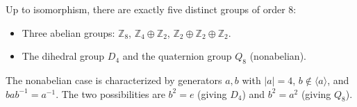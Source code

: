 Up to isomorphism, there are exactly five distinct groups of order $8$:
\begin{itemize}
\item Three abelian groups: $\mathbb{Z}_8$, $\mathbb{Z}_4 \oplus \mathbb{Z}_2$, $\mathbb{Z}_2 \oplus \mathbb{Z}_2 \oplus \mathbb{Z}_2$.
\item The dihedral group $D_4$ and the quaternion group $Q_8$ (nonabelian).
\end{itemize}
The nonabelian case is characterized by generators $a,b$ with $|a| = 4$, $b \notin \langle a \rangle$, and $bab^{-1} = a^{-1}$. The two possibilities are $b^2 = e$ (giving $D_4$) and $b^2 = a^2$ (giving $Q_8$).
